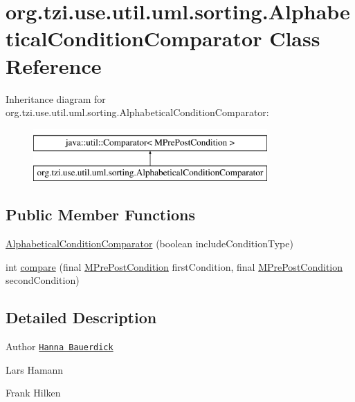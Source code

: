 \hypertarget{classorg_1_1tzi_1_1use_1_1util_1_1uml_1_1sorting_1_1_alphabetical_condition_comparator}{\section{org.\-tzi.\-use.\-util.\-uml.\-sorting.\-Alphabetical\-Condition\-Comparator Class Reference}
\label{classorg_1_1tzi_1_1use_1_1util_1_1uml_1_1sorting_1_1_alphabetical_condition_comparator}
}
Inheritance diagram for org.\-tzi.\-use.\-util.\-uml.\-sorting.\-Alphabetical\-Condition\-Comparator\-:\begin{figure}[H]
\begin{center}
\leavevmode
\includegraphics[height=2.000000cm]{classorg_1_1tzi_1_1use_1_1util_1_1uml_1_1sorting_1_1_alphabetical_condition_comparator}
\end{center}
\end{figure}
\subsection*{Public Member Functions}
\begin{DoxyCompactItemize}
\item 
\hyperlink{classorg_1_1tzi_1_1use_1_1util_1_1uml_1_1sorting_1_1_alphabetical_condition_comparator_a7e618251bdf49fd213664b5e7baeb478}{Alphabetical\-Condition\-Comparator} (boolean include\-Condition\-Type)
\item 
int \hyperlink{classorg_1_1tzi_1_1use_1_1util_1_1uml_1_1sorting_1_1_alphabetical_condition_comparator_a71eade380a5fd1aea882c423ac6d6cd0}{compare} (final \hyperlink{classorg_1_1tzi_1_1use_1_1uml_1_1mm_1_1_m_pre_post_condition}{M\-Pre\-Post\-Condition} first\-Condition, final \hyperlink{classorg_1_1tzi_1_1use_1_1uml_1_1mm_1_1_m_pre_post_condition}{M\-Pre\-Post\-Condition} second\-Condition)
\end{DoxyCompactItemize}


\subsection{Detailed Description}
\begin{DoxyAuthor}{Author}
\href{mailto:hanna@tzi.de}{\tt Hanna Bauerdick} 

Lars Hamann 

Frank Hilken 
\end{DoxyAuthor}



